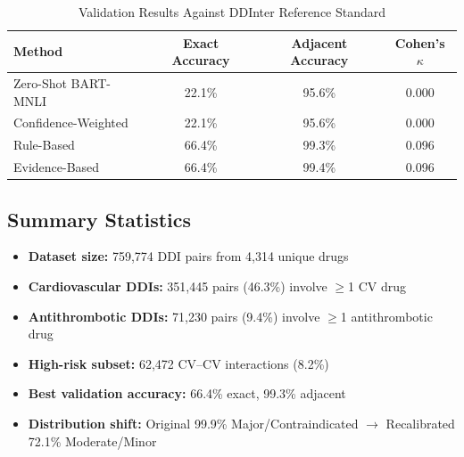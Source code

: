 \documentclass[11pt]{article}
\begin{document}
\begin{table}[H]
\centering
\caption{Validation Results Against DDInter Reference Standard}
\label{tab:validation}
\begin{tabular}{lccc}
\toprule
\textbf{Method} & \textbf{Exact Accuracy} & \textbf{Adjacent Accuracy} & \textbf{Cohen's $\kappa$} \\
\midrule
Zero-Shot BART-MNLI & 22.1\% & 95.6\% & 0.000 \\
Confidence-Weighted & 22.1\% & 95.6\% & 0.000 \\
Rule-Based & 66.4\% & 99.3\% & 0.096 \\
Evidence-Based & 66.4\% & 99.4\% & 0.096 \\
\bottomrule
\end{tabular}
\end{table}

\subsection*{Summary Statistics}

\begin{itemize}
    \item \textbf{Dataset size:} 759,774 DDI pairs from 4,314 unique drugs
    \item \textbf{Cardiovascular DDIs:} 351,445 pairs (46.3\%) involve $\geq$1 CV drug
    \item \textbf{Antithrombotic DDIs:} 71,230 pairs (9.4\%) involve $\geq$1 antithrombotic drug
    \item \textbf{High-risk subset:} 62,472 CV--CV interactions (8.2\%)
    \item \textbf{Best validation accuracy:} 66.4\% exact, 99.3\% adjacent
    \item \textbf{Distribution shift:} Original 99.9\% Major/Contraindicated $\rightarrow$ Recalibrated 72.1\% Moderate/Minor
\end{itemize}
\end{document}
